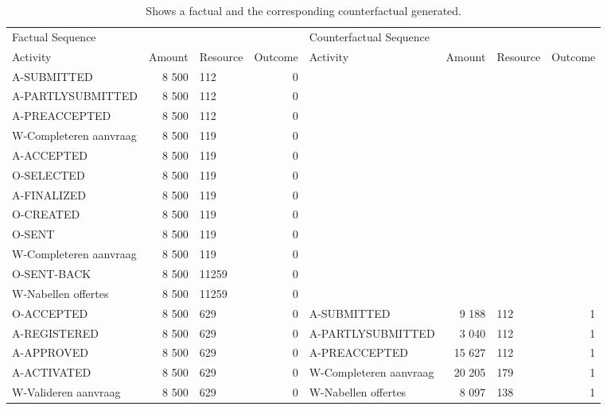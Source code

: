 \begin{table}
\caption{Shows a factual and the corresponding counterfactual generated. }
\label{tbl:example-cf-evo-rr}
\begin{tabular}{lrlrlrlr}
\toprule
\multicolumn{4}{l}{Factual Sequence} & \multicolumn{4}{l}{Counterfactual Sequence} \\
Activity & Amount & Resource & Outcome & Activity & Amount & Resource & Outcome \\
\midrule
A-SUBMITTED & 8 500 & 112 & 0 &  &  &  &  \\
A-PARTLYSUBMITTED & 8 500 & 112 & 0 &  &  &  &  \\
A-PREACCEPTED & 8 500 & 112 & 0 &  &  &  &  \\
W-Completeren aanvraag & 8 500 & 119 & 0 &  &  &  &  \\
A-ACCEPTED & 8 500 & 119 & 0 &  &  &  &  \\
O-SELECTED & 8 500 & 119 & 0 &  &  &  &  \\
A-FINALIZED & 8 500 & 119 & 0 &  &  &  &  \\
O-CREATED & 8 500 & 119 & 0 &  &  &  &  \\
O-SENT & 8 500 & 119 & 0 &  &  &  &  \\
W-Completeren aanvraag & 8 500 & 119 & 0 &  &  &  &  \\
O-SENT-BACK & 8 500 & 11259 & 0 &  &  &  &  \\
W-Nabellen offertes & 8 500 & 11259 & 0 &  &  &  &  \\
O-ACCEPTED & 8 500 & 629 & 0 & A-SUBMITTED & 9 188 & 112 & 1 \\
A-REGISTERED & 8 500 & 629 & 0 & A-PARTLYSUBMITTED & 3 040 & 112 & 1 \\
A-APPROVED & 8 500 & 629 & 0 & A-PREACCEPTED & 15 627 & 112 & 1 \\
A-ACTIVATED & 8 500 & 629 & 0 & W-Completeren aanvraag & 20 205 & 179 & 1 \\
W-Valideren aanvraag & 8 500 & 629 & 0 & W-Nabellen offertes & 8 097 & 138 & 1 \\
\bottomrule
\end{tabular}
\end{table}
